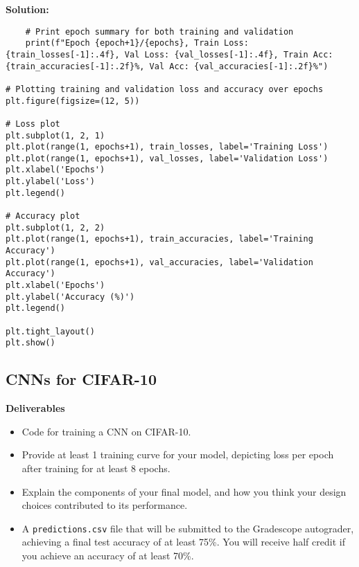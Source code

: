 \documentclass{article}
\newenvironment{solution}{\color{blue} \smallskip \textbf{Solution:}}{}
\begin{document}
\begin{solution}
\begin{verbatim}
    # Print epoch summary for both training and validation
    print(f"Epoch {epoch+1}/{epochs}, Train Loss: {train_losses[-1]:.4f}, Val Loss: {val_losses[-1]:.4f}, Train Acc: {train_accuracies[-1]:.2f}%, Val Acc: {val_accuracies[-1]:.2f}%")

# Plotting training and validation loss and accuracy over epochs
plt.figure(figsize=(12, 5))

# Loss plot
plt.subplot(1, 2, 1)
plt.plot(range(1, epochs+1), train_losses, label='Training Loss')
plt.plot(range(1, epochs+1), val_losses, label='Validation Loss')
plt.xlabel('Epochs')
plt.ylabel('Loss')
plt.legend()

# Accuracy plot
plt.subplot(1, 2, 2)
plt.plot(range(1, epochs+1), train_accuracies, label='Training Accuracy')
plt.plot(range(1, epochs+1), val_accuracies, label='Validation Accuracy')
plt.xlabel('Epochs')
plt.ylabel('Accuracy (%)')
plt.legend()

plt.tight_layout()
plt.show()

\end{verbatim}\newpage






\end{solution}

\newpage
\subsection{CNNs for CIFAR-10}
\textbf{Deliverables}
\begin{itemize}
    \item 
    Code for training a CNN on CIFAR-10.
    \item 
    Provide at least 1 training curve for your model, depicting loss per epoch after training for at least 8 epochs.
    \item 
    Explain the components of your final model, and how you think your design choices contributed to its performance.
    \item 
    A \texttt{predictions.csv} file that will be submitted to the Gradescope autograder, achieving a final test accuracy of at least 75\%. 
    You will receive half credit if you achieve an accuracy of at least 70\%.
\end{itemize}
\end{document}
